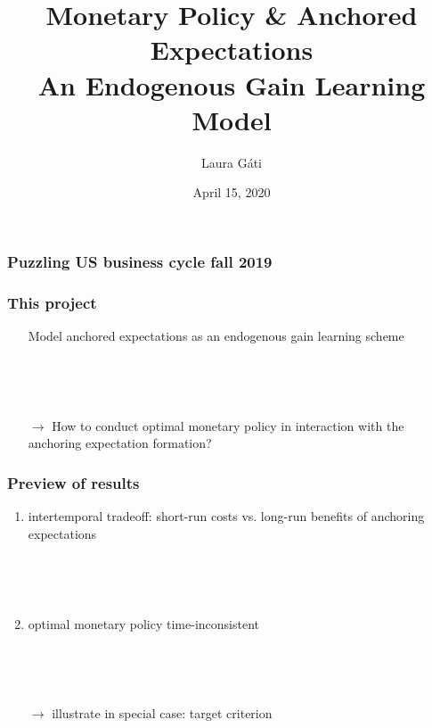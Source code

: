 \documentclass[11pt]{beamer}
\author[]{Laura G\'ati}
\institute[]{Boston College}
\title[]{Monetary Policy \& Anchored Expectations \\
An Endogenous Gain Learning Model}
\date[]{April 15, 2020}
\def \myFigPath {../../figures/}
\begin{document}
\begin{frame}

\maketitle


\end{frame}



\begin{frame}
	\frametitle{Puzzling US business cycle fall 2019}

\begin{figure}[h!]
\hfil {}
\end{figure}


\end{frame}



\begin{frame}
	\frametitle{This project}
	
	\begin{enumerate}
	\item[] Model anchored expectations as an endogenous gain learning scheme
	
	\
	
	\
	
	\item[$\rightarrow$] How to conduct optimal monetary policy in interaction with the anchoring expectation formation?
	\end{enumerate}
	\end{frame}
\begin{frame}
	\frametitle{Preview of results}
	
	\begin{enumerate}
	\item  intertemporal tradeoff: short-run costs vs. long-run benefits of anchoring expectations
	
	\
	
	\
	
	\item optimal monetary policy time-inconsistent
	
	\
	
	\
	
	
	\item[$\rightarrow$] illustrate in special case: target criterion 
	\end{enumerate}


\end{frame}
\end{document}
